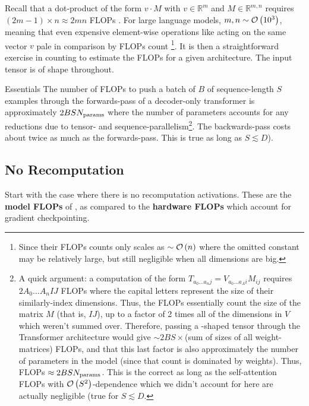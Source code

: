 \documentclass[11pt]{article}
\begin{document}
Recall that a dot-product of the form $ v \cdot M $  with $ v \in \mathbb{R}^{ m } $ and $ M \in
\mathbb{R} ^{ m, n }$ requires $ \left (2 m-1 \right )\times n \approx 2mn$ FLOPs .
For large language models, $ m,n \sim \mathcal{O} \left( 10 ^{ 3 } \right)  $, meaning that even expensive
element-wise operations like  acting on the same vector $ v $ pale in comparison by
FLOPs count \footnote{Since their FLOPs counts only scales as $ \sim \mathcal{O} \left( n\right )  $ where
the omitted constant may be relatively large, but still negligible when all dimensions are big.}. It
is then a straightforward exercise in counting to estimate the FLOPs for a given architecture. The
input tensor is of shape  throughout.

\begin{nicebox}{Essentials}
    The number of FLOPs to push a batch of $ B $ of sequence-length $ S $ examples through the forwards-pass
    of a decoder-only transformer is approximately $ 2BS N _{ {\rm params}  } $ where the number of
    parameters accounts for any reductions due to tensor- and sequence-parallelism\footnote{A quick argument: a
computation of the form $T _{ a _{ 0 }\ldots  a _{ n }j } =V _{ a _{ 0 }\ldots a _{ A
}i }M _{ ij } $ requires $ 2A _{ 0 }\ldots A _{ n }IJ $ FLOPs where the capital letters
represent the size of their similarly-index dimensions. Thus, the FLOPs
essentially count the size of the matrix $ M $ (that is, $ IJ $), up to a factor of 2 times all of the
dimensions in $ V $ which weren't summed over. Therefore, passing a
-shaped tensor through the Transformer architecture would give $ \sim 2BS\times
$(sum of sizes of all weight-matrices) FLOPs, and that this last factor is also approximately the number of
parameters in the model (since that count is dominated by weights). Thus, FLOPs $ \approx 2BSN _{
{\rm params}  } $. This is the correct as long as the self-attention FLOPs with $ \mathcal{O} \left( S ^{ 2 } \right)$-dependence which we
didn't account for here are actually negligible (true for $ S \lesssim D $.}. The backwards-pass
    costs about twice as much as the forwards-pass. This is true as long as $ S \lesssim D $).
\end{nicebox}



\subsection{No Recomputation}

Start with the case where there is no recomputation activations.  These are the \textbf{model FLOPs} of
\cite{korthikanti2022reducing}, as compared to the \textbf{hardware FLOPs} which account for gradient
checkpointing.
\end{document}
